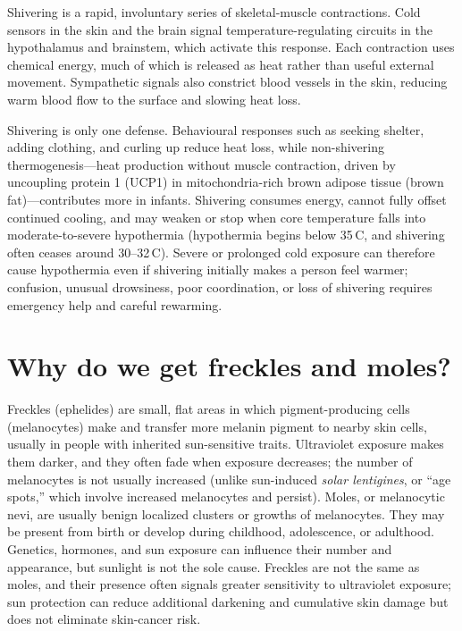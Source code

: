 \documentclass[11pt,oneside]{report}
\begin{document}
Shivering is a rapid, involuntary series of skeletal-muscle contractions. Cold
sensors in the skin and the brain signal temperature-regulating circuits in the
hypothalamus and brainstem, which activate this response. Each contraction uses
chemical energy, much of which is released as heat rather than useful external
movement. Sympathetic signals also constrict blood vessels in the skin,
reducing warm blood flow to the surface and slowing heat loss.

Shivering is only one defense. Behavioural responses such as seeking shelter,
adding clothing, and curling up reduce heat loss, while non-shivering
thermogenesis—heat production without muscle contraction, driven by uncoupling
protein 1 (UCP1) in mitochondria-rich brown adipose tissue (brown fat)—contributes
more in infants. Shivering consumes energy, cannot fully offset continued cooling,
and may weaken or stop when core temperature falls into moderate-to-severe
hypothermia (hypothermia begins below 35\,\textdegree C, and shivering often
ceases around 30--32\,\textdegree C). Severe or prolonged cold exposure can
therefore cause hypothermia even if shivering initially makes a person feel
warmer; confusion, unusual drowsiness, poor coordination, or loss of shivering
requires emergency help and careful rewarming.

\section{Why do we get freckles and moles?}

Freckles (ephelides) are small, flat areas in which pigment-producing cells
(melanocytes) make and transfer more melanin pigment to nearby skin cells,
usually in people with inherited sun-sensitive traits. Ultraviolet exposure
makes them darker, and they often fade when exposure decreases; the number of
melanocytes is not usually increased (unlike sun-induced \emph{solar
lentigines}, or ``age spots,'' which involve increased melanocytes and persist).
Moles, or melanocytic nevi, are usually benign localized clusters
or growths of melanocytes. They may be present from birth or develop during
childhood, adolescence, or adulthood. Genetics, hormones, and sun exposure can
influence their number and appearance, but sunlight is not the sole cause.
Freckles are not the same as moles, and their presence often signals greater
sensitivity to ultraviolet exposure; sun protection can reduce additional
darkening and cumulative skin damage but does not eliminate skin-cancer risk.
\end{document}
